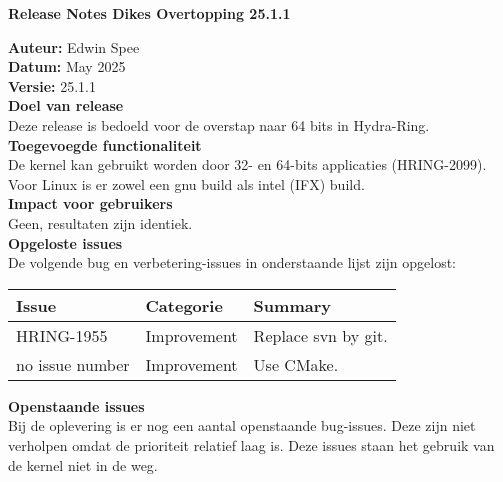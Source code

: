 \documentclass{BOI_References/BOIReleaseNotesLatexClass}
\begin{document}
{\LARGE\textbf{Release Notes Dikes Overtopping 25.1.1}} 

\textbf{Auteur:} Edwin Spee \\
\textbf{Datum:} May 2025 \\
\textbf{Versie:} 25.1.1 \\

\textbf{Doel van release} \\
Deze release is bedoeld voor de overstap naar 64 bits in Hydra-Ring. \\

\textbf{Toegevoegde functionaliteit} \\
De kernel kan gebruikt worden door 32- en 64-bits applicaties (HRING-2099). \\
Voor Linux is er zowel een gnu build als intel (IFX) build. \\

\textbf{Impact voor gebruikers} \\
Geen, resultaten zijn identiek. \\[6pt]

\textbf{Opgeloste issues} \\
De volgende bug en verbetering-issues in onderstaande lijst zijn opgelost:

\renewcommand{\arraystretch}{1.2}

\begin{longtable*}{|p{30mm}|p{22mm}|p{\textwidth-52mm-36pt}|} \hline
\textbf{Issue} & \textbf{Categorie} & \textbf{Summary} \\ \hline
HRING-1955 & Improvement  & Replace svn by git. \\ \hline
no issue number & Improvement  & Use CMake. \\ \hline
\end{longtable*}

\textbf{Openstaande issues} \\
Bij de oplevering is er nog een aantal openstaande bug-issues. 
Deze zijn niet verholpen omdat de prioriteit relatief laag is. 
Deze issues staan het gebruik van de kernel niet in de weg.

\end{document}
